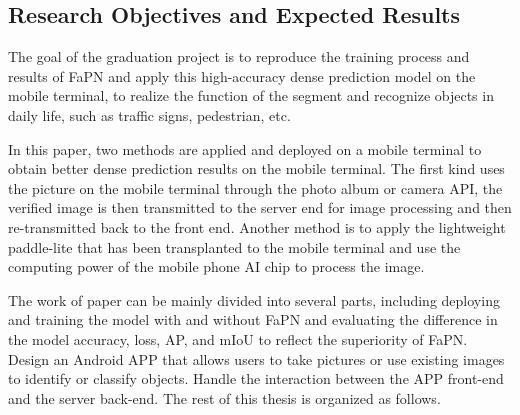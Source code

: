 

\subsection{Research Objectives and Expected Results}
The goal of the graduation project is to reproduce the training process and results of FaPN \cite{huang2021fapn} and apply this high-accuracy dense prediction model on the mobile terminal, to realize the function of the segment and recognize objects in daily life, such as traffic signs, pedestrian, etc.

In this paper, two methods are applied and deployed on a mobile terminal to obtain better dense prediction results on the mobile terminal. The first kind uses the picture on the mobile terminal through the photo album or camera API, the verified image is then transmitted to the server end for image processing and then re-transmitted back to the front end. Another method is to apply the lightweight paddle-lite \cite{paddlelite} that has been transplanted to the mobile terminal and use the computing power of the mobile phone AI chip to process the image.

The work of paper can be mainly divided into several parts, including deploying and training the model with and without FaPN and evaluating the difference in the model accuracy, loss, AP, and mIoU to reflect the superiority of FaPN. Design an Android APP that allows users to take pictures or use existing images to identify or classify objects. Handle the interaction between the APP front-end and the server back-end. The rest of this thesis is organized as follows. 

